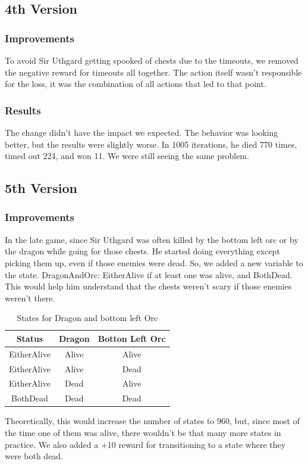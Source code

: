 \documentclass{article}
\begin{document}
  \subsection{4th Version}

  \subsubsection{Improvements}

  To avoid Sir Uthgard getting spooked of chests due to the timeouts, we removed the negative reward for timeouts all together. The action itself wasn't responsible for the loss, it was the combination of all actions that led to that point.  
  
  \subsubsection{Results}

  The change didn't have the impact we expected. The behavior was looking better, but the results were slightly worse. In 1005 iterations, he died 770 times, timed out 224, and won 11. We were still seeing the same problem.

  \subsection{5th Version}

  \subsubsection{Improvements}
  
  In the late game, since Sir Uthgard was often killed by the bottom left orc or by the dragon while going for those chests. He started doing everything except picking them up, even if those enemies were dead.
  So, we added a new variable to the state. DragonAndOrc: EitherAlive if at least one was alive, and BothDead. This would help him understand that the chests weren't scary if those enemies weren't there. 

  \begin{table}[h!]
    \centering
    \caption{States for Dragon and bottom left Orc}
    \label{tab:enemiesStates}
    \begin{tabular}{c|c|c}
      \textbf{Status} & \textbf{Dragon} & \textbf{Botton Left Orc}\\
      \hline
      EitherAlive & Alive & Alive\\
      EitherAlive & Alive & Dead\\
      EitherAlive & Dead & Alive\\
      BothDead & Dead & Dead\\
    \end{tabular}
  \end{table}
  \noindent
  Theoretically, this would increase the number of states to 960, but, since most of the time one of them was alive, there wouldn't be that many more states in practice. 
  We also added a +10 reward for transitioning to a state where they were both dead.
\end{document}

